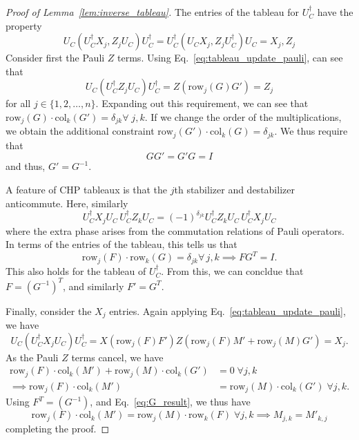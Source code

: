\begin{proof}[Proof of Lemma~\ref{lem:inverse_tableau}]
The entries of the tableau for $U_{C}^{\dagger}$ have the property
\[
U_{C}\left(U_{C}^{\dagger}X_{j},Z_{j}U_{C}\right)U_{C}^{\dagger} = U_{C}^{\dagger}\left(U_{C}X_{j},Z_{j}U_{C}^{\dagger}\right)U_{C}=X_{j},Z_{j}
\]
Consider first the Pauli $Z$ terms. Using Eq.~\ref{eq:tableau_update_pauli}, can see that
\[U_{C}\left(U_{C}^{\dagger}Z_{j}U_{C}\right)U_{C}^{\dagger} = Z(\text{row}_{j}(G)G') = Z_{j}\]
for all $j\in\{1,2,\dots,n\}$. Expanding out this requirement, we can see that $\text{row}_{j}(G)\cdot \text{col}_{k}(G') = \delta_{jk}\forall\;j,k$. If we change the order of the multiplications, we obtain the additional constraint $\text{row}_{j}(G')\cdot \text{col}_{k}(G)=\delta_{jk}$. We thus require that
\begin{equation}
GG'=G'G=I
\label{eq:G_result}
\end{equation}
and thus, $G'=G^{-1}$.\par
A feature of CHP tableaux is that the $j$th stabilizer and destabilizer anticommute. Here, similarly
\[U_{C}^{\dagger}X_{j}U_{C}\,U_{C}^{\dagger}Z_{k}U_{C}=\left(-1\right)^{\delta_{jk}}U_{C}^{\dagger}Z_{k}U_{C}\,U_{C}^{\dagger}X_{j}U_{C}\]
where the extra phase arises from the commutation relations of Pauli operators. In terms of the entries of the tableau, this tells us that
\[\text{row}_{j}(F)\cdot\text{row}_{k}(G)=\delta_{jk}\forall\,j,k\implies FG^{T}=I.\]
This also holds for the tableau of $U_{C}^{\dagger}$. From this, we can concldue that $F=\left(G^{-1}\right)^{T}$, and similarly $F'=G^{T}$.\par
Finally, consider the $X_{j}$ entries. Again applying Eq.~\ref{eq:tableau_update_pauli}, we have
\[U_{C}\left(U_{C}^{\dagger}X_{j}U_{C}\right)U_{C}^{\dagger}= X(\text{row}_{j}(F)F')Z(\text{row}_{j}(F)M' + \text{row}_{j}(M)G') = X_{j}.\]
As the Pauli $Z$ terms cancel, we have
\begin{align*}
\text{row}_{j}(F)\cdot\text{col}_{k}(M')+\text{row}_{j}(M)\cdot\text{col}_{k}(G')&=0\;\forall j,k\\
\implies \text{row}_{j}(F)\cdot\text{col}_{k}(M') &= \text{row}_{j}(M)\cdot\text{col}_{k}(G')\;\forall j,k.
\end{align*}
Using $F^{T}=(G^{-1})$, and Eq.~\ref{eq:G_result}, we thus have
\begin{equation}
\text{row}_{j}(F)\cdot\text{col}_{k}(M')=\text{row}_{j}(M)\cdot\text{row}_{k}(F)\;\forall j,k\implies M_{j,k}=M'_{k,j}
\end{equation}
completing the proof.
\end{proof}
